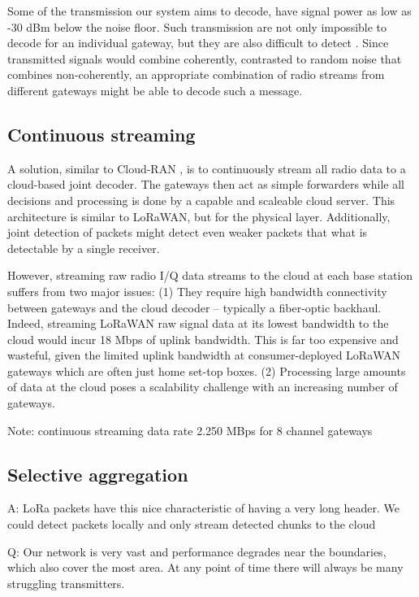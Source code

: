 Some of the transmission our system aims to decode, have signal power as low
as -30 dBm below the noise floor. Such transmission are not only impossible to
decode for an individual gateway, but they are also difficult to detect .
Since transmitted signals would combine coherently, contrasted to random noise
that combines non-coherently, an appropriate combination of radio streams
from different gateways might be able to decode such a message.

\subsection{Continuous streaming}
\label{sec:continuus-streaming}

A solution, similar to Cloud-RAN \cite{chen2011c}, is to continuously
stream all radio data to a cloud-based joint decoder. The gateways then act as
simple forwarders while all decisions and processing is done by a capable and
scaleable cloud server. This architecture is similar to LoRaWAN, but for the
physical layer. Additionally, joint detection of packets might detect even
weaker packets that what is detectable by a single receiver.

However, streaming raw radio I/Q data streams to the cloud at each base
station suffers from two major issues: (1) They require high bandwidth
connectivity between gateways and the cloud decoder -- typically a fiber-optic
backhaul. Indeed, streaming LoRaWAN raw signal data at its lowest bandwidth
to the cloud would incur 18 Mbps of uplink bandwidth. This is far too
expensive and wasteful, given the limited uplink bandwidth at
consumer-deployed LoRaWAN gateways which are often just home set-top boxes.
(2) Processing large amounts of data at the cloud poses a scalability
challenge with an increasing number of gateways.






Note: continuous streaming data rate 2.250 MBps for 8 channel gateways

\subsection{Selective aggregation}
\label{sec:selective-aggregation}

A: LoRa packets have this nice characteristic of having a very long header. We could detect packets locally and only stream detected chunks to the cloud

Q: Our network is very vast and performance degrades near the boundaries, which also cover the most area. At any point of time there will always be many struggling transmitters.
